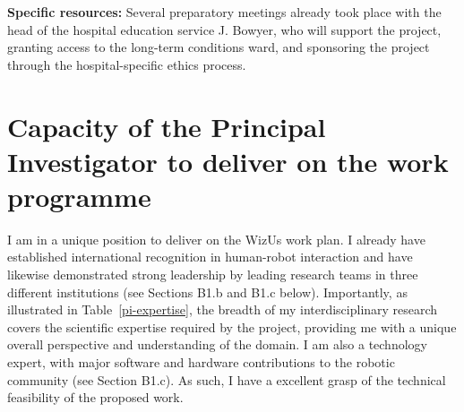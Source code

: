 \documentclass[11pt,a4paper]{report}
\newcommand{\project}{WizUs\xspace}
\begin{document}
\textbf{Specific resources:} Several preparatory meetings already took place
with the head of the hospital education service J. Bowyer, who will support the
project, granting access to the long-term conditions ward, and sponsoring the
project through the hospital-specific ethics process.


\section{Capacity of the Principal Investigator to deliver on the work programme}

I am in a unique position to deliver on the \project work plan. I already have
established international recognition in human-robot interaction and have
likewise demonstrated strong leadership by leading research teams in three
different institutions (see Sections B1.b and B1.c below). Importantly, as
illustrated in Table~\ref{pi-expertise}, the breadth of my interdisciplinary
research covers the scientific expertise required by the project, providing me
with a unique overall perspective and understanding of the domain. I am also a
technology expert, with major software and hardware contributions to the robotic
community (see Section B1.c). As such, I have a excellent grasp of the technical
feasibility of the proposed work.
\end{document}
